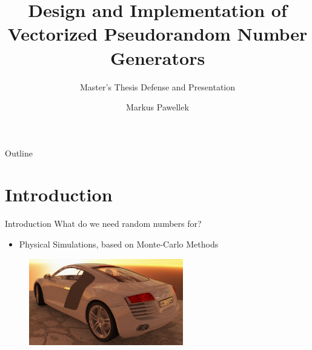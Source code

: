 \documentclass[aspectratio=169]{beamer}
\title{%
  Design and Implementation of Vectorized Pseudorandom Number Generators%
}
\subtitle{Master's Thesis Defense and Presentation}
\author{Markus Pawellek}
\begin{document}

  \frame{\titlepage}
  \begin{frame}{Outline}
    \footnotesize
    \hfill\parbox[t][7cm][l]{0.9\textwidth}{\tableofcontents}
  \end{frame}

  \section{Introduction} %
  \label{sec:introduction}
    \begin{frame}{Introduction}
      What do we need random numbers for?
      \pause
      \begin{itemize}
        \item Physical Simulations, based on Monte-Carlo Methods
      \end{itemize}
      \pause
      \begin{figure}
        \includegraphics[width=0.6\textwidth]{images/audi_r8_path_tracing.png}
      \end{figure}
    \end{frame}

\end{document}
